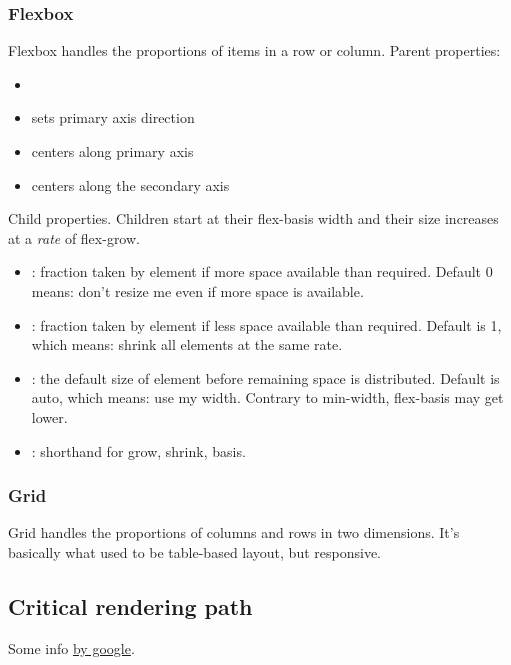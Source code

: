 \subsubsection{Flexbox}\label{flexbox}
Flexbox handles the proportions of items in a row or column.
Parent properties:
\begin{itemize}
    \item {}
    \item {} sets primary axis direction
    \item {} centers along primary axis
    \item {} centers along the secondary axis
\end{itemize}
Child properties. Children start at their flex-basis width and their size increases at a \emph{rate} of flex-grow.
\begin{itemize}
    \item {}: fraction taken by element if more space available than required. Default 0 means: don't resize me even if more space is available.
    \item {}: fraction taken by element if less space available than required. Default is 1, which means: shrink all elements at the same rate.
    \item {}: the default size of element before remaining space is distributed. Default is auto, which means: use my width. Contrary to min-width, flex-basis may get lower.
    \item {}: shorthand for grow, shrink, basis.
\end{itemize}

\subsubsection{Grid}
Grid handles the proportions of columns and rows in two dimensions. It's basically what used to be table-based layout, but responsive.

\subsection{Critical rendering path} 
Some info \href{https://developers.google.com/web/fundamentals/performance/critical-rendering-path/optimizing-critical-rendering-path}{by google}.